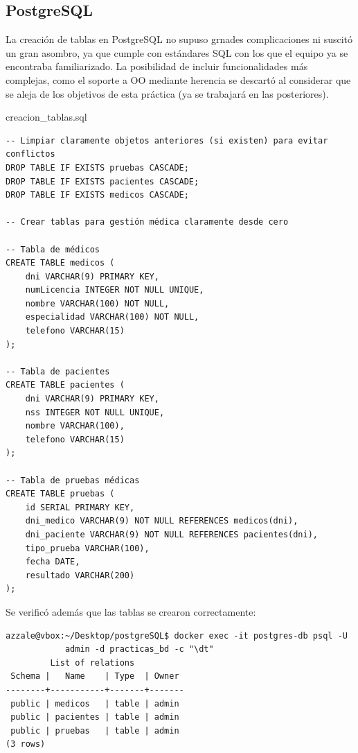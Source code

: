 \documentclass{article}
\begin{document}
\subsection{PostgreSQL}
La creación de tablas en PostgreSQL no supuso grnades complicaciones ni suscitó un gran asombro, ya que cumple con estándares SQL con los que el equipo ya se encontraba familiarizado. La posibilidad de incluir funcionalidades más complejas, como el soporte a OO mediante herencia se descartó al considerar que se aleja de los objetivos de esta práctica (ya se trabajará en las posteriores).
\begin{scriptbox}{creacion\_tablas.sql}
\begin{verbatim}
-- Limpiar claramente objetos anteriores (si existen) para evitar conflictos
DROP TABLE IF EXISTS pruebas CASCADE;
DROP TABLE IF EXISTS pacientes CASCADE;
DROP TABLE IF EXISTS medicos CASCADE;

-- Crear tablas para gestión médica claramente desde cero

-- Tabla de médicos
CREATE TABLE medicos (
    dni VARCHAR(9) PRIMARY KEY,
    numLicencia INTEGER NOT NULL UNIQUE,
    nombre VARCHAR(100) NOT NULL,
    especialidad VARCHAR(100) NOT NULL,
    telefono VARCHAR(15)
);

-- Tabla de pacientes
CREATE TABLE pacientes (
    dni VARCHAR(9) PRIMARY KEY,
    nss INTEGER NOT NULL UNIQUE,
    nombre VARCHAR(100),
    telefono VARCHAR(15)
);

-- Tabla de pruebas médicas
CREATE TABLE pruebas (
    id SERIAL PRIMARY KEY,
    dni_medico VARCHAR(9) NOT NULL REFERENCES medicos(dni),
    dni_paciente VARCHAR(9) NOT NULL REFERENCES pacientes(dni),
    tipo_prueba VARCHAR(100),
    fecha DATE,
    resultado VARCHAR(200)
);
\end{verbatim}
\end{scriptbox}
Se verificó además que las tablas se crearon correctamente:
\begin{tcolorbox}[colback=black, coltext=white, fontupper=\ttfamily, title=Terminal]
\begin{verbatim}
azzale@vbox:~/Desktop/postgreSQL$ docker exec -it postgres-db psql -U 
            admin -d practicas_bd -c "\dt"
         List of relations
 Schema |   Name    | Type  | Owner 
--------+-----------+-------+-------
 public | medicos   | table | admin
 public | pacientes | table | admin
 public | pruebas   | table | admin
(3 rows)

\end{verbatim}
\end{tcolorbox}
\end{document}
